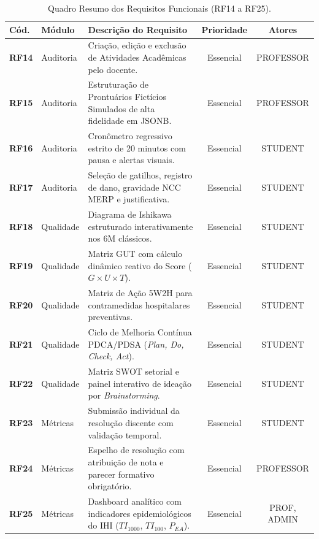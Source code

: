 \begin{table}[htb]
\centering
\small
\caption{Quadro Resumo dos Requisitos Funcionais (RF14 a RF25).}
\label{tab_rf_consolidado_2}
\begin{tabularx}{\textwidth}{l l X c c}
\toprule
\textbf{Cód.} & \textbf{Módulo} & \textbf{Descrição do Requisito} & \textbf{Prioridade} & \textbf{Atores} \\
\midrule
\textbf{RF14} & Auditoria & Criação, edição e exclusão de Atividades Acadêmicas pelo docente. & Essencial & PROFESSOR \\
\midrule
\textbf{RF15} & Auditoria & Estruturação de Prontuários Fictícios Simulados de alta fidelidade em JSONB. & Essencial & PROFESSOR \\
\midrule
\textbf{RF16} & Auditoria & Cronômetro regressivo estrito de 20 minutos com pausa e alertas visuais. & Essencial & STUDENT \\
\midrule
\textbf{RF17} & Auditoria & Seleção de gatilhos, registro de dano, gravidade NCC MERP e justificativa. & Essencial & STUDENT \\
\midrule
\textbf{RF18} & Qualidade & Diagrama de Ishikawa estruturado interativamente nos 6M clássicos. & Essencial & STUDENT \\
\midrule
\textbf{RF19} & Qualidade & Matriz GUT com cálculo dinâmico reativo do Score ($G \times U \times T$). & Essencial & STUDENT \\
\midrule
\textbf{RF20} & Qualidade & Matriz de Ação 5W2H para contramedidas hospitalares preventivas. & Essencial & STUDENT \\
\midrule
\textbf{RF21} & Qualidade & Ciclo de Melhoria Contínua PDCA/PDSA (\textit{Plan, Do, Check, Act}). & Essencial & STUDENT \\
\midrule
\textbf{RF22} & Qualidade & Matriz SWOT setorial e painel interativo de ideação por \textit{Brainstorming}. & Essencial & STUDENT \\
\midrule
\textbf{RF23} & Métricas & Submissão individual da resolução discente com validação temporal. & Essencial & STUDENT \\
\midrule
\textbf{RF24} & Métricas & Espelho de resolução com atribuição de nota e parecer formativo obrigatório. & Essencial & PROFESSOR \\
\midrule
\textbf{RF25} & Métricas & Dashboard analítico com indicadores epidemiológicos do IHI ($TI_{1000}$, $TI_{100}$, $P_{EA}$). & Essencial & PROF, ADMIN \\
\bottomrule
\end{tabularx}
\end{table}
